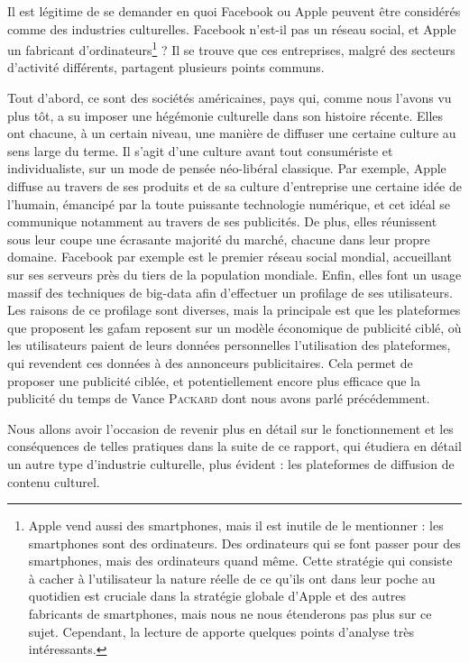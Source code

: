 \documentclass[a4paper,14pt]{extreport}
\begin{document}
Il est légitime de se demander en quoi Facebook ou Apple peuvent être considérés comme des industries culturelles. Facebook n'est-il pas un réseau social, et Apple un fabricant d'ordinateurs\footnote{Apple vend aussi des smartphones, mais il est inutile de le mentionner : les smartphones sont des ordinateurs. Des ordinateurs qui se font passer pour des smartphones, mais des ordinateurs quand même. Cette stratégie qui consiste à cacher à l'utilisateur la nature réelle de ce qu'ils ont dans leur poche au quotidien est cruciale dans la stratégie globale d'Apple et des autres fabricants de smartphones, mais nous ne nous étenderons pas plus sur ce sujet. Cependant, la lecture de \cite{kids_computer} apporte quelques points d'analyse très intéressants.} ? Il se trouve que ces entreprises, malgré des secteurs d'activité différents, partagent plusieurs points communs.

Tout d'abord, ce sont des sociétés américaines, pays qui, comme nous l'avons vu plus tôt, a su imposer une hégémonie culturelle dans son histoire récente. Elles ont chacune, à un certain niveau, une manière de diffuser une certaine culture au sens large du terme. Il s'agit d'une culture avant tout consumériste et individualiste, sur un mode de pensée néo-libéral classique. Par exemple, Apple diffuse au travers de ses produits et de sa culture d'entreprise une certaine idée de l'humain, émancipé par la toute puissante technologie numérique, et cet idéal se communique notamment au travers de ses publicités. De plus, elles réunissent sous leur coupe une écrasante majorité du marché, chacune dans leur propre domaine. Facebook par exemple est le premier réseau social mondial, accueillant sur ses serveurs près du tiers de la population mondiale. Enfin, elles font un usage massif des techniques de \gls{big-data} afin d'effectuer un profilage de ses utilisateurs. Les raisons de ce profilage sont diverses, mais la principale est que les plateformes que proposent les \gls{gafam} reposent sur un modèle économique de publicité ciblé, où les utilisateurs paient de leurs données personnelles l'utilisation des plateformes, qui revendent ces données à des annonceurs publicitaires. Cela permet de proposer une publicité ciblée, et potentiellement encore plus efficace que la publicité du temps de Vance \textsc{Packard} dont nous avons parlé précédemment.

Nous allons avoir l'occasion de revenir plus en détail sur le fonctionnement et les conséquences de telles pratiques dans la suite de ce rapport, qui étudiera en détail un autre type d'industrie culturelle, plus évident : les plateformes de diffusion de contenu culturel.
\end{document}
